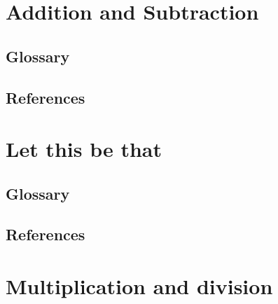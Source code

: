 \documentclass[12pt]{book}
\begin{document}
\chapter{Addition and Subtraction}%

\section{Glossary}
\section{References}
\newpage

\chapter{Let this be that}%
\section{Glossary}
\section{References}
\newpage

\chapter{Multiplication and division}%
\end{document}
